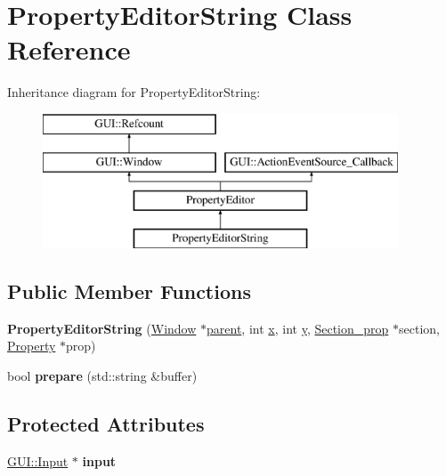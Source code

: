 \hypertarget{classPropertyEditorString}{\section{Property\-Editor\-String Class Reference}
\label{classPropertyEditorString}
}
Inheritance diagram for Property\-Editor\-String\-:\begin{figure}[H]
\begin{center}
\leavevmode
\includegraphics[height=4.000000cm]{classPropertyEditorString}
\end{center}
\end{figure}
\subsection*{Public Member Functions}
\begin{DoxyCompactItemize}
\item 
\hypertarget{classPropertyEditorString_a31b0d946bf3f3266c7c99db8c74e72c2}{{\bfseries Property\-Editor\-String} (\hyperlink{classGUI_1_1Window_ae828e9daa964dfc65a3550fb03117d30}{Window} $\ast$\hyperlink{classGUI_1_1Window_a2e593ff65e7702178d82fe9010a0b539}{parent}, int \hyperlink{classGUI_1_1Window_a6ca6a80ca00c9e1d8ceea8d3d99a657d}{x}, int \hyperlink{classGUI_1_1Window_a0ee8e923aff2c3661fc2e17656d37adf}{y}, \hyperlink{classSection__prop}{Section\-\_\-prop} $\ast$section, \hyperlink{classProperty}{Property} $\ast$prop)}\label{classPropertyEditorString_a31b0d946bf3f3266c7c99db8c74e72c2}

\item 
\hypertarget{classPropertyEditorString_a4653327f5d42f8b8146ecad5d1c9a53e}{bool {\bfseries prepare} (std\-::string \&buffer)}\label{classPropertyEditorString_a4653327f5d42f8b8146ecad5d1c9a53e}

\end{DoxyCompactItemize}
\subsection*{Protected Attributes}
\begin{DoxyCompactItemize}
\item 
\hypertarget{classPropertyEditorString_a01df4231c719d774740cc9dcb24682d5}{\hyperlink{classGUI_1_1Input}{G\-U\-I\-::\-Input} $\ast$ {\bfseries input}}\label{classPropertyEditorString_a01df4231c719d774740cc9dcb24682d5}

\end{DoxyCompactItemize}


